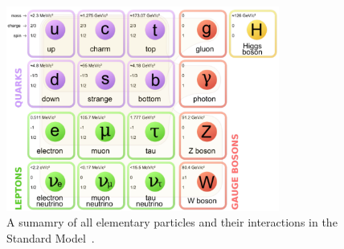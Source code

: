 \begin{figure}[hbtp]
 \begin{center}
   \includegraphics[width=0.8\textwidth]{ch2_figs/sm_particles_periodic_table.pdf}
   \caption{A sumamry of all elementary particles and their interactions in the Standard Model~\cite{sm_table}.}
   \label{fig:sm_periodic_table}
 \end{center}
\end{figure}

